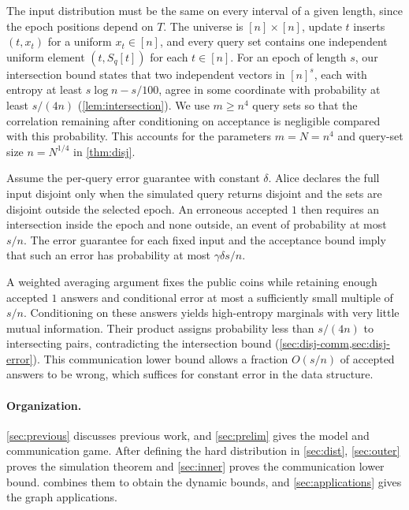 \documentclass[11pt]{article}
\theoremstyle{plain}
\begin{document}
The input distribution must be the same on every interval of a given length, since the epoch positions depend on $T$. The universe is $[n]\times[n]$, update $t$ inserts $(t,x_t)$ for a uniform $x_t\in[n]$, and every query set contains one independent uniform element $(t,S_q[t])$ for each $t\in[n]$. For an epoch of length $s$, our intersection bound states that two independent vectors in $[n]^s$, each with entropy at least $s\log n-s/100$, agree in some coordinate with probability at least $s/(4n)$ (\cref{lem:intersection}). We use $m\ge n^4$ query sets so that the correlation remaining after conditioning on acceptance is negligible compared with this probability. This accounts for the parameters $m=N=n^4$ and query-set size $n=N^{1/4}$ in \cref{thm:disj}.

Assume the per-query error guarantee with constant $\delta$. Alice declares the full input disjoint only when the simulated query returns disjoint and the sets are disjoint outside the selected epoch. An erroneous accepted $1$ then requires an intersection inside the epoch and none outside, an event of probability at most $s/n$. The error guarantee for each fixed input and the acceptance bound imply that such an error has probability at most $\gamma\delta s/n$.

A weighted averaging argument fixes the public coins while retaining enough accepted $1$ answers and conditional error at most a sufficiently small multiple of $s/n$. Conditioning on these answers yields high-entropy marginals with very little mutual information. Their product assigns probability less than $s/(4n)$ to intersecting pairs, contradicting the intersection bound (\cref{sec:disj-comm,sec:disj-error}). This communication lower bound allows a fraction $O(s/n)$ of accepted answers to be wrong, which suffices for constant error in the data structure.

\paragraph{Organization.}
\cref{sec:previous} discusses previous work, and \cref{sec:prelim} gives the model and communication game. After defining the hard distribution in \cref{sec:dist}, \cref{sec:outer} proves the simulation theorem and \cref{sec:inner} proves the communication lower bound.  combines them to obtain the dynamic bounds, and \cref{sec:applications} gives the graph applications.

\end{document}
